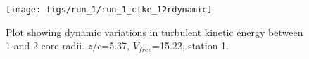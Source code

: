 \begin{figure}[H]
\centering
\texttt{[image: figs/run\_1/run\_1\_ctke\_12rdynamic]}
\caption{Plot showing dynamic variations in turbulent kinetic energy between 1 and 2 core radii. $z/c$=5.37, $V_{free}$=15.22, station 1.}
\label{fig:run_1_ctke_12rdynamic}
\end{figure}


